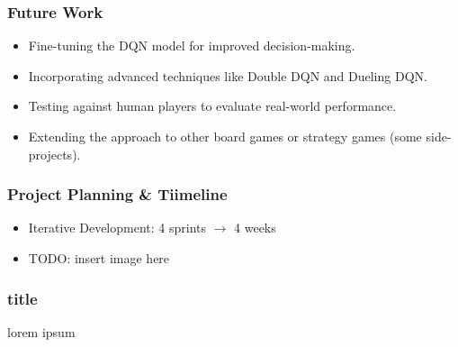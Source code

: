 
\begin{frame}
	\frametitle{Future Work}
	\vspace{0.5cm}
	\begin{itemize}
		\item Fine-tuning the DQN model for improved decision-making.
		\item Incorporating advanced techniques like Double DQN and Dueling DQN.
		\item Testing against human players to evaluate real-world performance.
		\item Extending the approach to other board games or strategy games (some side-projects).
	\end{itemize}
\end{frame}


\begin{frame}
	\frametitle{Project Planning \& Tiimeline}
	\vspace{0.5cm}
	\begin{itemize}
		\item Iterative Development: 4 sprints $\rightarrow$ 4 weeks
		\item TODO: insert image here
	\end{itemize}
\end{frame}

\PraesentationMasterWeissBlau
\begin{frame}
\end{frame}
\PraesentationMasterStandard

\begin{frame}
    \frametitle{title}
    \vspace{0.5cm}
    lorem ipsum
\end{frame}






